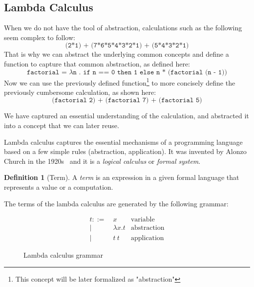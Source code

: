 \documentclass[12pt]{article}
\theoremstyle{definition}
\newtheorem{definition}{Definition}[section]
\newcommand{\code}[1]{\texttt{#1}}
\begin{document}
\subsection{Lambda Calculus}

When we do not have the tool of abstraction, calculations such as the following seem complex to follow:
\begin{equation*}
       \code{(2*1) + (7*6*5*4*3*2*1) + (5*4*3*2*1)}
\end{equation*}
That is why we can abstract the underlying common concepts and define a function to capture that common abstraction, as defined here:
\begin{equation*}
       \code{factorial = $\lambda$n . if n == 0 then 1 else n * (factorial (n - 1))}
\end{equation*}
Now we can use the previously defined function\footnote{This concept will be later formalized as "abstraction"} to more concisely define the previously cumbersome calculation, as shown here:
\begin{equation*}
       \code{(factorial 2) + (factorial 7) + (factorial 5)}
\end{equation*}

We have captured an essential understanding of the calculation, and abstracted it into a concept that we can later reuse.

Lambda calculus captures the essential mechanisms of a programming language based on a few simple rules (abstraction, application). It was invented by Alonzo Church in the 1920s~\cite{tapl} and it is a \emph{logical calculus} or \emph{formal system}.

\begin{definition}[Term]
       A \emph{term} is an expression in a given formal language that represents a value or a computation.
\end{definition}

The terms of the lambda calculus are generated by the following grammar:

\begin{figure}[H]
       \begin{equation*}
              \begin{aligned}
                     t ::= & \ x            & \text{variable}    \\
                     |     & \  \lambda x.t & \text{abstraction} \\
                     |     & \  t\ t        & \text{application}
              \end{aligned}
       \end{equation*}
       \caption{Lambda calculus grammar}\label{fig:lambda-calc-grammar}
\end{figure}
\end{document}
